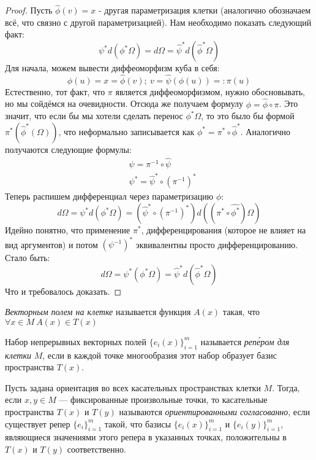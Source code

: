 \begin{proof}
	Пусть $\hat{\phi}(v) = x$ - другая параметризация клетки (аналогично обозначаем всё, что связно с другой параметризацией). Нам необходимо показать следующий факт:
	\[
		\psi^*d(\phi^*\Omega) = d\Omega = \hat{\psi}^*d(\hat{\phi}^*\Omega)
	\]
	Для начала, можем вывести диффеоморфизм куба в себя:
	\[
		\phi(u) = x = \hat{\phi}(v);\ v = \hat{\psi}(\phi(u)) =: \pi(u)
	\]
	Естественно, тот факт, что $\pi$ является диффеоморфизмом, нужно обосновывать, но мы сойдёмся на очевидности. Отсюда же получаем формулу $\phi = \hat{\phi} \circ \pi$. Это значит, что если бы мы хотели сделать перенос $\phi^*\Omega$, то это было бы формой $\pi^*(\hat{\phi}^*(\Omega))$, что неформально записывается как $\phi^* = \pi^* \circ \hat{\phi}^*$. Аналогично получаются следующие формулы:
	\begin{align*}
		&{\psi = \pi^{-1} \circ \hat{\psi}}
		\\
		&{\psi^* = \hat{\psi}^* \circ (\pi^{-1})^*}
	\end{align*}
	Теперь распишем дифференциал через параметризацию $\phi$:
	\[
		d\Omega = \psi^*d(\phi^*\Omega) = (\hat{\psi}^* \circ (\pi^{-1})^*)d((\pi^* \circ \hat{\phi^*})\Omega)
	\]
	Идейно понятно, что применение $\pi^*$, дифференцирования (которое не влияет на вид аргументов) и потом $(\psi^{-1})^*$ эквивалентны просто дифференцированию. Стало быть:
	\[
		d\Omega = \psi^*(\phi^*\Omega) = \hat{\psi}^*d(\hat{\phi}^*\Omega)
	\]
	Что и требовалось доказать.
\end{proof}

\begin{definition}
	\textit{Векторным полем на клетке} называется функция $A(x)$ такая, что $\forall x \in M\ A(x) \in T(x)$
\end{definition}

\begin{definition}
	Набор непрерывных векторных полей $\{e_i(x)\}_{i = 1}^m$ называется \textit{реп\'{е}ром для клетки} $M$, если в каждой точке многообразия этот набор образует базис пространства $T(x)$.
\end{definition}

\begin{definition}
	Пусть задана ориентация во всех касательных пространствах клетки $M$. Тогда, если $x, y \in M$ --- фиксированные произвольные точки, то касательные пространства $T(x)$ и $T(y)$ называются \textit{ориентированными согласованно}, если существует репер $\{e_i\}_{i = 1}^m$ такой, что базисы $\{e_i(x)\}_{i = 1}^m$ и $\{e_i(y)\}_{i = 1}^m$, являющиеся значениями этого репера в указанных точках, положительны в $T(x)$ и $T(y)$ соответственно.
\end{definition}

